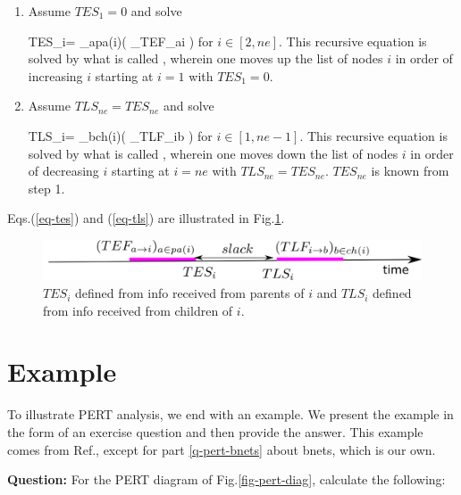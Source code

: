 \begin{enumerate}
\item Assume $TES_1=0$ and solve

\beq
TES_i= \max_{a\in pa(i)}(
_{TEF_{a\rarrow i}}
)
\;
\label{eq-tes}
\eeq
for $i\in [2, ne]$.
This recursive equation is solved
by what is called
,
wherein one 
moves up the list of
nodes $i$ in order 
of increasing 
$i$
starting at $i=1$ with $TES_1=0$.

\item Assume $TLS_{ne}=TES_{ne}$ and solve

\beq
TLS_i= \min_{b\in ch(i)}(
_{TLF_{i\rarrow b}}
)
\;
\label{eq-tls}
\eeq
for $i\in [1, ne-1]$. This recursive
equation is solved
by what is called
,
wherein one 
moves down the list of
nodes $i$ in order 
of decreasing 
$i$
starting at $i=ne$ with $TLS_{ne}=TES_{ne}$.
$TES_{ne}$ is known from step 1.
\end{enumerate}
Eqs.(\ref{eq-tes}) and (\ref{eq-tls})
are illustrated in Fig.\ref{fig-pert-t-interval}.



\begin{figure}[h!]
\centering
\includegraphics[width=6in]{pert/pert.png}
\caption{
$TES_i$ 
defined from info received
from parents of  $i$
and  $TLS_i$
defined from info received 
from children of $i$.} 
\label{fig-pert-t-interval}
\end{figure}

\section{Example}
To illustrate PERT analysis, we end 
with an example. We present the 
example
in the form of an exercise question and then
provide the answer. This example
comes from Ref.\cite{ibook},
except for part \ref{q-pert-bnets} 
about bnets, which is our own.

{\bf Question:}
For the PERT diagram of Fig.\ref{fig-pert-diag},
calculate the following:


